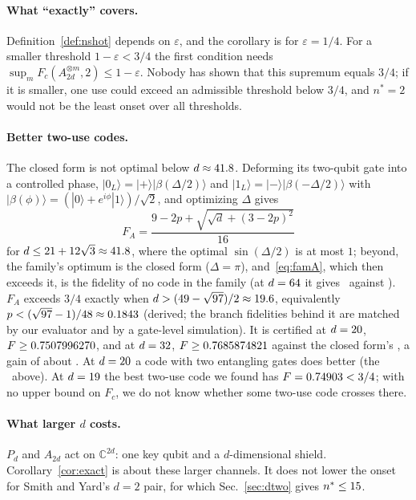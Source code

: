 \documentclass[aps,pra,twocolumn,superscriptaddress,nofootinbib,longbibliography,floatfix]{revtex4-2}
\newcommand{\ket}[1]{|#1\rangle}
\begin{document}
\paragraph*{What ``exactly'' covers.} Definition~\ref{def:nshot} depends on $\varepsilon$, and the corollary is for $\varepsilon=1/4$. For a smaller threshold $1-\varepsilon<3/4$ the first condition needs $\sup_mF_c(A_{2d}^{\otimes m},2)\le1-\varepsilon$. Nobody has shown that this supremum equals $3/4$; if it is smaller, one use could exceed an admissible threshold below $3/4$, and $n^*=2$ would not be the least onset over all thresholds.

\paragraph*{Better two-use codes.} The closed form is not optimal below $d\approx41.8$. Deforming its two-qubit gate into a controlled phase, $\ket{0_L}=\ket+\ket{\beta(\varDelta/2)}$ and $\ket{1_L}=\ket-\ket{\beta(-\varDelta/2)}$ with $\ket{\beta(\phi)}=(\ket0+e^{i\phi}\ket1)/\sqrt2$, and optimizing $\varDelta$ gives
\begin{equation}
F_A=\frac{9-2p+\sqrt{\sqrt d+(3-2p)^2}}{16}
\label{eq:famA}
\end{equation}
for $d\le21+12\sqrt3\approx41.8$, where the optimal $\sin(\varDelta/2)$ is at most $1$; beyond, the family's optimum is the closed form ($\varDelta=\pi$), and~\eqref{eq:famA}, which then exceeds it, is the fidelity of no code in the family (at $d=64$ it gives \FamASixtyFour\ against \ClosedSixtyFourFrac). $F_A$ exceeds $3/4$ exactly when $d>(49-\sqrt{97})/2\approx19.6$, equivalently $p<(\sqrt{97}-1)/48\approx0.1843$ (derived; the branch fidelities behind it are matched by our evaluator and by a gate-level simulation). It is certified at $d=20$, $F\ge0.7507996270$, and at $d=32$, $F\ge0.7685874821$ against the closed form's \ClosedThirtyTwo, a gain of about \FamAGain. At $d=20$ a code with two entangling gates does better (the \NuseTwenty\ above). At $d=19$ the best two-use code we found has $F=0.74903<3/4$; with no upper bound on $F_c$, we do not know whether some two-use code crosses there.

\paragraph*{What larger $d$ costs.} $P_d$ and $A_{2d}$ act on $\mathbb C^{2d}$: one key qubit and a $d$-dimensional shield. Corollary~\ref{cor:exact} is about these larger channels. It does not lower the onset for Smith and Yard's $d=2$ pair, for which Sec.~\ref{sec:dtwo} gives $n^*\le15$.
\end{document}
